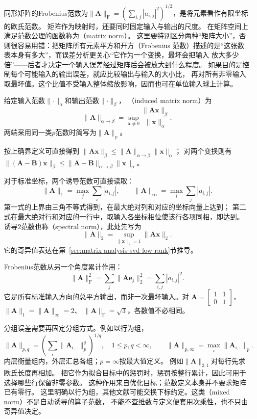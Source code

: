 同形矩阵的Frobenius范数为$\lVert\bm A\rVert_{\mathrm F}
=(\sum_{i,j}|a_{i,j}|^2)^{1/2}$，是将元素看作有限坐标的欧氏范数。
矩阵作为映射时，还要同时固定输入与输出的尺度。
在矩阵空间上满足范数公理的函数称为（matrix norm）。
这里要特别区分两种“矩阵大小”，否则很容易用错：把矩阵所有元素平方和开方（Frobenius
范数）描述的是“这张数表本身有多大”，而误差分析更关心“它作为一个变换，最坏会把输入
放大多少倍”——后者才决定一个输入误差经过矩阵后会被放大到什么程度。
如果目的是控制每个可能输入的输出误差，就应比较输出与输入的大小比，
再对所有非零输入取最坏值。这个比值不受输入整体缩放影响，因而也可在单位输入球上计算。
\begin{definition}[由向量范数诱导的矩阵范数]
\label{def:matrix-analysis-induced-norm}
给定输入范数$\lVert\cdot\rVert_\alpha$和输出范数$\lVert\cdot\rVert_\beta$，
（induced matrix norm）为
\[
 \lVert\bm A\rVert_{\alpha\to\beta}
 =\sup_{\bm x\neq0}\frac{\lVert\bm A\bm x\rVert_\beta}
                         {\lVert\bm x\rVert_\alpha}.
\]
两端采用同一类$p$范数时简写为$\lVert\bm A\rVert_p$。
\end{definition}
按上确界定义可直接得到
$\lVert\bm A\bm x\rVert_\beta\leq
\lVert\bm A\rVert_{\alpha\to\beta}\lVert\bm x\rVert_\alpha$；
对两个变换则有
$\lVert(\bm A-\bm B)\bm x\rVert_\beta\leq
\lVert\bm A-\bm B\rVert_{\alpha\to\beta}\lVert\bm x\rVert_\alpha$。

对于标准坐标，两个诱导范数可直接读取：
\[
 \lVert\bm A\rVert_1=\max_j\sum_i|a_{i,j}|,\qquad
 \lVert\bm A\rVert_\infty=\max_i\sum_j|a_{i,j}|.
\]
第一式的上界由三角不等式得到，在最大绝对列和对应的坐标向量上达到；
第二式在最大绝对行和对应的一行中，取输入各坐标相位使该行各项同相，即达到。
诱导$2$范数也称（spectral norm），此处先写为
\[
 \lVert\bm A\rVert_2
 =\sup_{\lVert\bm x\rVert_2=1}\lVert\bm A\bm x\rVert_2.
\]
它的奇异值表达在第~\ref{sec:matrix-analysis-svd-low-rank}节推导。

Frobenius范数从另一个角度累计作用：
\[
 \lVert\bm A\rVert_{\mathrm F}^2
 =\sum_j\lVert\bm A\bm e_j\rVert_2^2
 =\sum_{i,j}|a_{i,j}|^2.
\]
它是所有标准输入方向的总平方输出，而非一次最坏输入。对
$\bm A=\left[\begin{smallmatrix}1&1\\0&1\end{smallmatrix}\right]$，
$\lVert\bm A\rVert_1=\lVert\bm A\rVert_\infty=2$、
$\lVert\bm A\rVert_{\mathrm F}=\sqrt3$，各数值不必相同。


分组误差需要再固定分组方式。例如以行为组，
\[
 \lVert\bm A\rVert_{p,q}
 =\left(\sum_i\lVert\bm A_{i,:}\rVert_p^q\right)^{1/q},
 \quad 1\leq p,q<\infty,
 \qquad
 \lVert\bm A\rVert_{p,\infty}=\max_i\lVert\bm A_{i,:}\rVert_p.
\]
内层衡量组内，外层汇总各组；$p=\infty$按最大值定义。
例如$\lVert\bm A\rVert_{2,1}$对每行先求欧氏长度再相加。
把它作为拟合目标中的惩罚时，惩罚按整行累计，因此可用于选择哪些行保留非零参数。
这种作用来自优化目标；范数定义本身并不要求矩阵已有零行。
这里明确以行为组，其他文献可能交换下标约定。这类（mixed norm）不是自动诱导的算子范数，
不能不查维数与定义便套用次乘性，也不只由奇异值决定。


